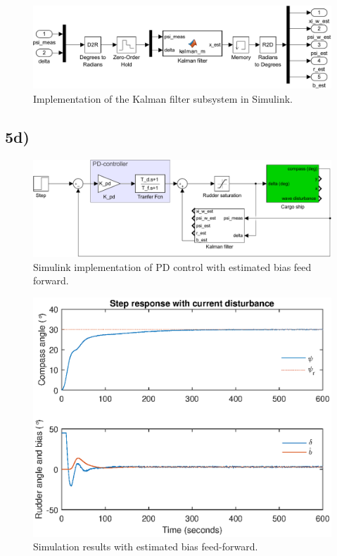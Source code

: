 

\begin{figure}
    \centering
    \includegraphics[width=\textwidth]{images/oppg5/c_kalman.pdf}
    \caption{Implementation of the Kalman filter subsystem in Simulink.}
    \label{fig:kalman_subsys}
\end{figure}

\subsection{5d)}

\begin{figure}
    \centering
    \includegraphics[width=\textwidth]{images/oppg5/bias_FF.pdf}
    \caption{Simulink implementation of PD control with estimated bias feed forward.}
    \label{fig:bias_ff}
\end{figure}

\begin{figure}
    \centering
    \includegraphics[width=\textwidth]{images/oppg5/5d.eps}
    \caption{Simulation results with estimated bias feed-forward.}
    \label{fig:5d}
\end{figure}


